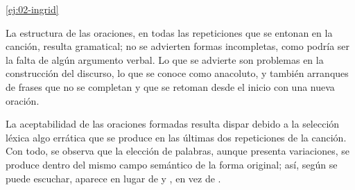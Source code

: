 \begin{solucion}{\ref{ej:02-ingrid}}
\begin{consignas}
  \item La estructura de las oraciones, en todas las repeticiones que se entonan
        en la canción, resulta gramatical; no se advierten formas incompletas,
        como podría ser la falta de algún argumento verbal. Lo que se advierte
        son problemas en la construcción del discurso, lo que se conoce como
        anacoluto, y también arranques de frases que no se completan y que se
        retoman desde el inicio con una nueva oración.
  \item La aceptabilidad de las oraciones formadas resulta dispar debido a la
        selección léxica algo errática que se produce en las últimas dos
        repeticiones de la canción. Con todo, se observa que la elección de
        palabras, aunque presenta variaciones, se produce dentro del mismo campo
        semántico de la forma original; así, según se puede escuchar, aparece
         en lugar de  y
        , en vez de .
\end{consignas}
\end{solucion}

